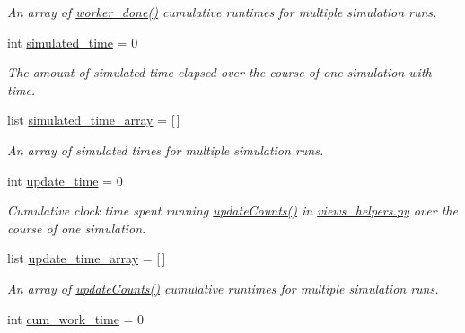 \begin{DoxyCompactItemize}
\begin{DoxyCompactList}\small\item\em An array of \hyperlink{namespacedynamicfilterapp_1_1views__helpers_af27860dfe5bfa6b2b8a1b29347eb918d}{worker\+\_\+done()} cumulative runtimes for multiple simulation runs. \end{DoxyCompactList}\item 
int \hyperlink{classdynamicfilterapp_1_1test__simulations_1_1_simulation_test_a6f5fc01b7113c998fcfc7cb55d4d726e}{simulated\+\_\+time} = 0
\begin{DoxyCompactList}\small\item\em The amount of simulated time elapsed over the course of one simulation with time. \end{DoxyCompactList}\item 
list \hyperlink{classdynamicfilterapp_1_1test__simulations_1_1_simulation_test_ab2666a2c03eb51015003354a03c0f25e}{simulated\+\_\+time\+\_\+array} = \mbox{[}$\,$\mbox{]}
\begin{DoxyCompactList}\small\item\em An array of simulated times for multiple simulation runs. \end{DoxyCompactList}\item 
int \hyperlink{classdynamicfilterapp_1_1test__simulations_1_1_simulation_test_ac218a6f58aae0da542fe9887eb8a6c21}{update\+\_\+time} = 0
\begin{DoxyCompactList}\small\item\em Cumulative clock time spent running \hyperlink{namespacedynamicfilterapp_1_1views__helpers_a57d6ebd6f2f99cba59b82eded490891f}{update\+Counts()} in \hyperlink{views__helpers_8py}{views\+\_\+helpers.\+py} over the course of one simulation. \end{DoxyCompactList}\item 
list \hyperlink{classdynamicfilterapp_1_1test__simulations_1_1_simulation_test_ab4055eae9396bd4aed941b202095d298}{update\+\_\+time\+\_\+array} = \mbox{[}$\,$\mbox{]}
\begin{DoxyCompactList}\small\item\em An array of \hyperlink{namespacedynamicfilterapp_1_1views__helpers_a57d6ebd6f2f99cba59b82eded490891f}{update\+Counts()} cumulative runtimes for multiple simulation runs. \end{DoxyCompactList}\item 
int \hyperlink{classdynamicfilterapp_1_1test__simulations_1_1_simulation_test_a3bb2bc391dd71366cb5923135d4e9bfd}{cum\+\_\+work\+\_\+time} = 0

\end{DoxyCompactItemize}

